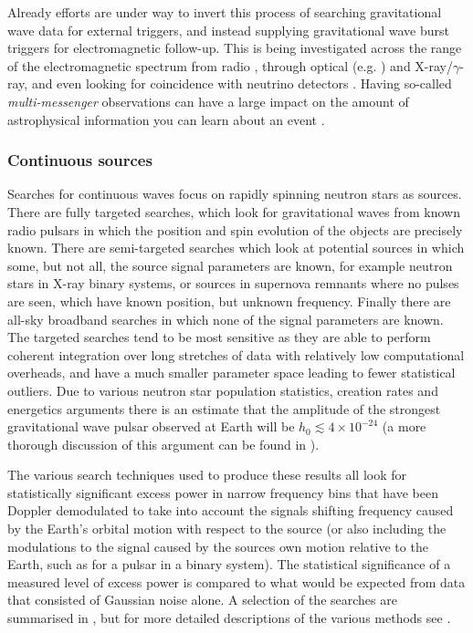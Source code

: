 \documentclass{article}
\begin{document}
Already efforts are under way to invert this process of searching gravitational 
wave data for external triggers, and instead supplying gravitational wave burst 
triggers for electromagnetic follow-up. This is being investigated across the
range of the electromagnetic spectrum from radio \cite{Predoi:2010}, through
optical (e.g. \cite{Kanner:2008, Coward:2010}) and X-ray/$\gamma$-ray, and even 
looking for coincidence with neutrino detectors \cite{Aso:2008, Pradier:2010, 
Chassande:2010}. Having so-called {\it multi-messenger} observations can have a
large impact on the amount of astrophysical information you can learn about an 
event \cite{Phinney:2009}.

\subsubsection{Continuous sources}
Searches for continuous waves focus on rapidly spinning neutron stars as
sources. There are fully targeted searches, which look for gravitational waves
from known radio pulsars in which the position and spin evolution of the objects
are precisely known. There are semi-targeted searches which look at potential
sources in which some, but not all, the source signal parameters are known, for
example neutron stars in X-ray binary systems, or sources in supernova remnants
where no pulses are seen, which have known position, but unknown frequency. 
Finally there are all-sky broadband searches in which
none of the signal parameters are known. The targeted searches tend to be most
sensitive as they are able to perform coherent integration over long stretches
of data with relatively low computational overheads, and have a much smaller
parameter space leading to fewer statistical outliers. Due to various neutron
star population statistics, creation rates and energetics arguments there is an
estimate that the amplitude of the strongest gravitational wave pulsar observed
at Earth will be $h_0 \lesssim 4\times10^{-24}$ \cite{Abbott:2007a} (a more
thorough discussion of this argument can be found in \cite{Knispel:2008}).

The various search techniques used to produce these results all look for
statistically significant excess power in narrow frequency bins that have been
Doppler demodulated to take into account the signals shifting frequency
caused by the Earth's orbital motion with respect to the source (or also
including the modulations to the signal caused by the sources own motion 
relative to the Earth, such as for a pulsar in a binary system). The statistical 
significance of a measured
level of excess power is compared to what would be expected from data that
consisted of Gaussian noise alone. A selection of the searches are summarised
in \cite{Prix:2006}, but for more detailed descriptions of the various methods
see \cite{Brady:2000, Krishnan:2004, Jaranowski:1998, Abbott:2008e,
Abbott:2007a, Dupuis:2005}.
\end{document}
